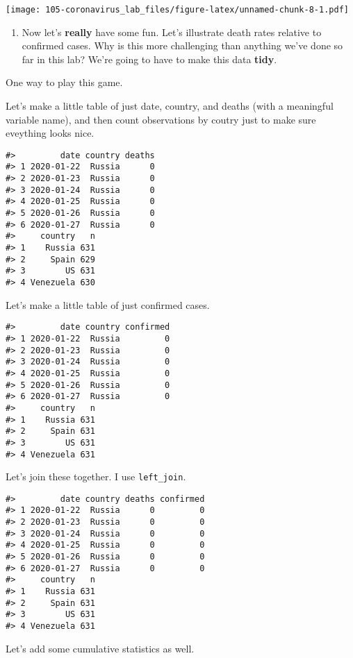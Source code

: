 \documentclass[
]{book}
\providecommand{\tightlist}{%
  \setlength{\itemsep}{0pt}\setlength{\parskip}{0pt}}
\begin{document}
\texttt{[image: 105-coronavirus\_lab\_files/figure-latex/unnamed-chunk-8-1.pdf]}

\begin{enumerate}
\def\labelenumi{\arabic{enumi}.}
\setcounter{enumi}{6}
\tightlist
\item
  Now let's \textbf{really} have some fun. Let's illustrate death rates relative to confirmed cases. Why is this more challenging than anything we've done so far in this lab? We're going to have to make this data \textbf{tidy}.
\end{enumerate}

One way to play this game.

Let's make a little table of just date, country, and deaths (with a meaningful variable name), and then count observations by coutry just to make sure eveything looks nice.

\begin{verbatim}
#>         date country deaths
#> 1 2020-01-22  Russia      0
#> 2 2020-01-23  Russia      0
#> 3 2020-01-24  Russia      0
#> 4 2020-01-25  Russia      0
#> 5 2020-01-26  Russia      0
#> 6 2020-01-27  Russia      0
#>     country   n
#> 1    Russia 631
#> 2     Spain 629
#> 3        US 631
#> 4 Venezuela 630
\end{verbatim}

Let's make a little table of just confirmed cases.

\begin{verbatim}
#>         date country confirmed
#> 1 2020-01-22  Russia         0
#> 2 2020-01-23  Russia         0
#> 3 2020-01-24  Russia         0
#> 4 2020-01-25  Russia         0
#> 5 2020-01-26  Russia         0
#> 6 2020-01-27  Russia         0
#>     country   n
#> 1    Russia 631
#> 2     Spain 631
#> 3        US 631
#> 4 Venezuela 631
\end{verbatim}

Let's join these together. I use \texttt{left\_join}.

\begin{verbatim}
#>         date country deaths confirmed
#> 1 2020-01-22  Russia      0         0
#> 2 2020-01-23  Russia      0         0
#> 3 2020-01-24  Russia      0         0
#> 4 2020-01-25  Russia      0         0
#> 5 2020-01-26  Russia      0         0
#> 6 2020-01-27  Russia      0         0
#>     country   n
#> 1    Russia 631
#> 2     Spain 631
#> 3        US 631
#> 4 Venezuela 631
\end{verbatim}

Let's add some cumulative statistics as well.
\end{document}
